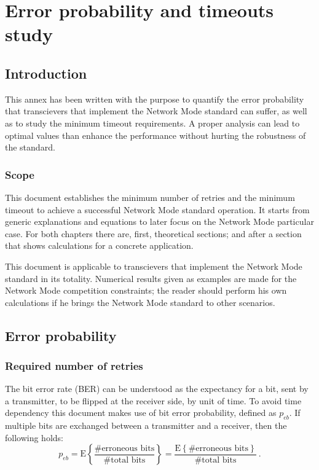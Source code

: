 \chapter{Error probability and timeouts study} \label{chapter:errors}
\section{Introduction}
This annex has been written with the purpose to quantify the error probability that transcievers that implement the Network Mode standard can suffer, as well as to study the minimum timeout requirements. A proper analysis can lead to optimal values than enhance the performance without hurting the robustness of the standard.


\subsection{Scope}
This document establishes the minimum number of retries and the minimum timeout to achieve a successful Network Mode standard operation. It starts from generic explanations and equations to later focus on the Network Mode particular case. For both chapters there are, first, theoretical sections; and after a section that shows calculations for a concrete application.

This document is applicable to transcievers that implement the Network Mode standard in its totality. Numerical results given as examples are made for the Network Mode competition constraints; the reader should perform his own calculations if he brings the Network Mode standard to other scenarios.


\section{Error probability}

\subsection{Required number of retries}
The bit error rate (BER) can be understood as the expectancy for a bit, sent by a transmitter, to be flipped at the receiver side, by unit of time. To avoid time dependency this document makes use of bit error probability, defined as $p_{eb}$. If multiple bits are exchanged between a transmitter and a receiver, then the following holds:
\begin{equation}
	p_{eb} = \text{E} \left \{ \frac{ \text{\# erroneous bits}}{\text{\# total bits}}  \right \} = \frac{ \text{E} \left \{  \text{\# erroneous bits}  \right \} }{\text{\# total bits}} \ .
\end{equation}

